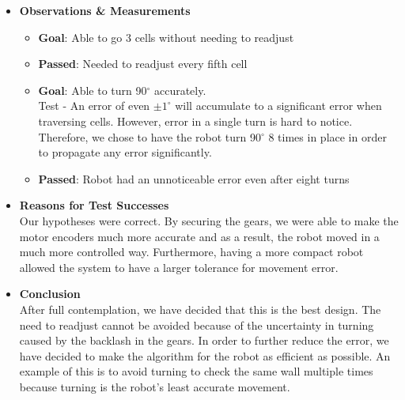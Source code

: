 \documentclass[11pt]{article}
\begin{document}
\begin{itemize}
\item \textbf{Observations \& Measurements}
	\begin{itemize}
	\item \textbf{Goal}: Able to go 3 cells without needing to readjust
 	\item \textbf{Passed}: Needed to readjust every fifth cell
 	\item \textbf{Goal}: Able to turn 90$^{\circ}$ accurately.\\
	Test - An error of even $ \pm 1^{\circ}$ will accumulate to a significant error when traversing cells. However, error in a single turn is hard to notice. Therefore, we chose to have the robot turn 90$^{\circ}$ 8 times in place in order to propagate any error significantly.
	\item \textbf{Passed}: Robot had an unnoticeable error even after eight turns
	\end{itemize}
\item \textbf{Reasons for Test Successes}\\
Our hypotheses were correct. By securing the gears, we were able to make the motor encoders much more accurate and as a result, the robot moved in a much more controlled way. Furthermore, having a more compact robot allowed the system to have a larger tolerance for movement error.
\item \textbf{Conclusion}\\
After full contemplation, we have decided that this is the best design. The need to readjust cannot be avoided because of the uncertainty in turning caused by the backlash in the gears. In order to further reduce the error, we have decided to make the algorithm for the robot as efficient as possible. An example of this is to avoid turning to check the same wall multiple times because turning is the robot's least accurate movement.
\end{itemize}
\newpage

\end{document}
